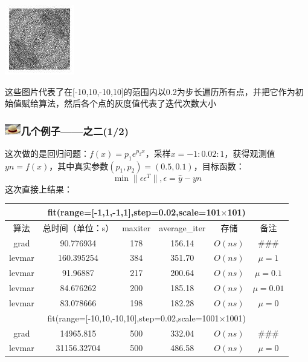 \documentclass{beamer}
\begin{document}
\begin{frame}
\begin{center}
\includegraphics[width=0.23\linewidth]{Images/bfgs_hat_80.jpg}
\end{center}
\vspace{-3mm}
这些图片代表了在[-10,10,-10,10]的范围内以0.2为步长遍历所有点，并把它作为初始值赋给算法，然后各个点的灰度值代表了迭代次数大小
\end{frame}
\begin{frame}
\frametitle{\includegraphics[width=7mm,height=5mm]{Images/strawhat.jpg}几个例子——之二(1/2)}
这次做的是回归问题：$f(x)=p_1e^{p_2x}$，采样$x=-1:0.02:1$，获得观测值$yn=f(x)$，其中真实参数$(p_1,p_2)=(0.5,0.1)$，目标函数：
\begin{displaymath}
\min\|\epsilon\epsilon^{T}\|,\epsilon=\hat{y}-yn
\end{displaymath}
这次直接上结果：\\
\vspace{-3mm}
\begin{table}[h]
\centering
\begin{tabular}{|c|c|c|c|c|c|}\hline
\multicolumn{6}{|c|}{fit(range=[-1,1,-1,1],step=0.02,scale=101$\times$101)} \\\hline
算法 &总时间（单位：s） &maxiter &average\_iter &存储 &备注\\ \hline
grad &90.776934 &178 &156.14 &$O(ns)$ &\#\#\# \\ \hline
levmar &160.395254 &384 &351.70 &$O(ns)$ &$\mu=1$ \\ \hline
levmar &91.96887 &217 &200.64 &$O(ns)$ &$\mu=0.1$ \\ \hline
levmar &84.676262 &200 &185.18 &$O(ns)$ &$\mu=0.01$ \\ \hline
levmar &83.078666 &198 &182.28 &$O(ns)$ &$\mu=0$ \\ \hline
\multicolumn{6}{|c|}{fit(range=[-10,10,-10,10],step=0.02,scale=1001$\times$1001)} \\\hline
grad &14965.815 &500 &332.04 &$O(ns)$ &\#\#\# \\ \hline
levmar &31156.32704 &500 &486.58 &$O(ns)$ &$\mu=0$ \\ \hline
\end{tabular}
\label{exp_2}
\end{table}
\end{frame}
\end{document}
